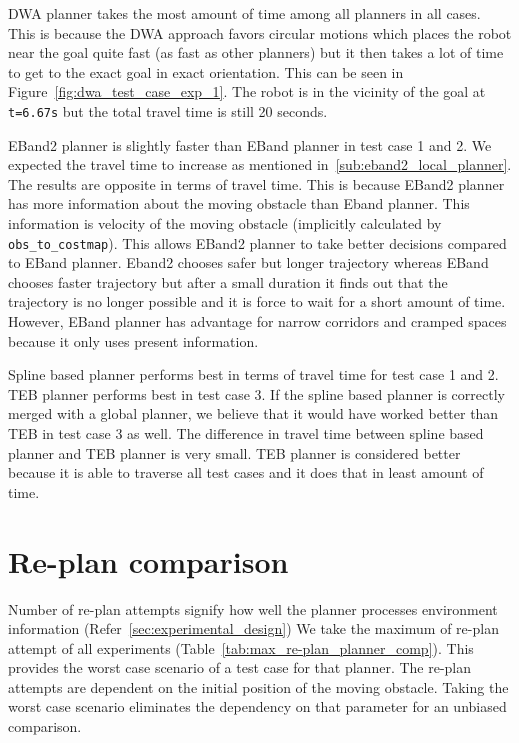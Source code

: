DWA planner takes the most amount of time among
all planners in all cases. This is because the DWA approach favors circular motions which places the robot
near the goal quite fast (as fast as other planners) but it then takes a lot of time to get to the
exact goal in exact orientation. This can be seen in Figure~\ref{fig:dwa_test_case_exp_1}. The robot
is in the vicinity of the goal at \texttt{t=6.67s} but the total travel time is still 20 seconds.

EBand2 planner is slightly faster than EBand planner in test case 1 and 2. We expected the travel time to increase as mentioned
in~\ref{sub:eband2_local_planner}. The results are opposite in terms of travel time. This is
because EBand2 planner has more information about the moving obstacle than Eband planner. This 
information is velocity of the moving obstacle (implicitly calculated by \texttt{obs\_to\_costmap}).
This allows EBand2 planner to take better decisions compared to EBand planner. Eband2 chooses safer
but longer trajectory whereas EBand chooses faster trajectory but after a small duration it finds out
that the trajectory is no longer possible and it is force to wait for a short amount of time. However,
EBand planner has advantage for narrow corridors and cramped spaces because it only uses present information.

Spline based planner performs best in terms of travel time for test case 1 and 2. TEB planner performs
best in test case 3. If the spline based planner is correctly merged with a global planner, we believe
that it would have worked better than TEB in test case 3 as well. The difference in travel time 
between spline based planner and TEB planner is very small. TEB planner is considered better 
because it is able to traverse all test cases and it does that in least amount of time.


\section{Re-plan comparison}%
\label{sec:re-plan_comparison}

Number of re-plan attempts signify how well the planner processes environment information (Refer~\ref{sec:experimental_design})
We take the maximum of re-plan attempt of all experiments (Table~\ref{tab:max_re-plan_planner_comp}).
This provides the worst case scenario of 
a test case for that planner. The re-plan attempts are dependent on the initial position of the moving
obstacle. Taking the worst case scenario eliminates the dependency on that parameter for an unbiased comparison.

